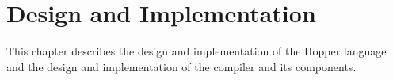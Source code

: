 \chapter{Design and Implementation}

This chapter describes the design and implementation of the Hopper language and the design
and implementation of the compiler and its components.







